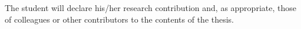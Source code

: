 
The student will declare his/her research contribution and, as appropriate, 
those of colleagues or other contributors to the contents of the thesis. 